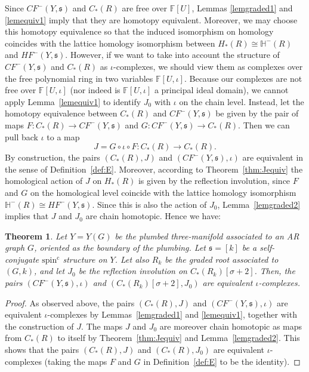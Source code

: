 \documentclass[11 pt]{amsart}
\newtheorem {theorem}{Theorem}[section]
\theoremstyle{remark}
\def\spinc {{\operatorname{spin^c}}}
\def\s{\mathfrak s}
\def\ff {{\mathbb{F}}}
\def\He{\mathbb{H}}
\def\CF {\mathit{CF}}
\def\HF {\mathit{HF}}
\newcommand \CFm {\CF^-}
\newcommand \HFm {\HF^-}
\def\inv{\iota}
\begin{document}
Since $\CFm(Y, \s)$ and $C_*(R)$ are free over $\ff[U]$, Lemmas \ref{lemgraded1} and \ref{lemequiv1} imply that they are homotopy equivalent. Moreover, we may choose this homotopy equivalence so that the induced isomorphism on homology coincides with the lattice homology isomorphism between $H_*(R) \cong \He^-(R)$ and $\HFm(Y, \s)$.  However, if we want to take into account the structure of $\CFm(Y, \s)$ and $C_*(R)$ as $\inv$-complexes, we should view them as complexes over the free polynomial ring in two variables $\ff[U, \inv]$. Because our complexes are not free over $\ff[U, \inv]$ (nor indeed is $\ff[U, \inv]$ a principal ideal domain), we cannot apply Lemma~\ref{lemequiv1} to identify $J_0$ with $\inv$ on the chain level. Instead, let the homotopy equivalence between $C_*(R)$ and $\CFm(Y, \s)$ be given by the pair of maps $F: C_*(R) \rightarrow \CFm(Y, \s)$ and $G: \CFm(Y, \s) \rightarrow C_*(R)$. Then we can pull back $\inv$ to a map
$$ J = G \circ \inv \circ F: C_*(R) \rightarrow C_*(R). $$
By construction, the pairs $(C_*(R), J)$ and $(\CFm(Y, \s), \inv)$ are equivalent in the sense of Definition~\ref{def:E}. Moreover, according to Theorem~\ref{thm:Jequiv} the homological action of $J$ on $H_*(R)$ is given by the reflection involution, since $F$ and $G$ on the homological level coincide with the lattice homology isomorphism $\He^-(R) \cong \HFm(Y, \s)$. Since this is also the action of $J_0$, Lemma~\ref{lemgraded2} implies that $J$ and $J_0$ are chain homotopic. Hence we have:

\begin{theorem}\label{thm:standard}
Let $Y=Y(G)$ be the plumbed three-manifold associated to an AR graph $G$, oriented as the boundary of the plumbing. Let $\s=[k]$ be a self-conjugate $\spinc$ structure on $Y$. Let also $R_k$ be the graded root associated to $(G, k)$, and let $J_0$ be the reflection involution on $C_*(R_k)[\sigma + 2]$. Then, the pairs $(\CFm(Y, \s), \inv)$ and $(C_*(R_k)[\sigma+2], J_0)$ are equivalent $\inv$-complexes.
\end{theorem}
\begin{proof}
As observed above, the pairs $(C_*(R), J)$ and $(\CFm(Y, \s), \inv)$ are equivalent $\inv$-complexes by Lemmas~\ref{lemgraded1} and \ref{lemequiv1}, together with the construction of $J$. The maps $J$ and $J_0$ are moreover chain homotopic as maps from $C_*(R)$ to itself by Theorem~\ref{thm:Jequiv} and Lemma~\ref{lemgraded2}. This shows that the pairs $(C_*(R), J)$ and $(C_*(R), J_0)$ are equivalent $\inv$-complexes (taking the maps $F$ and $G$ in Definition~\ref{def:E} to be the identity).
\end{proof}
\end{document}
